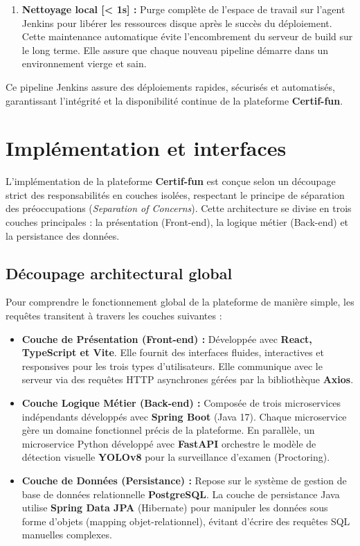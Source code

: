 \begin{enumerate}
    \item \textbf{Nettoyage local [< 1s] :} Purge complète de l'espace de travail sur l'agent Jenkins pour libérer les ressources disque après le succès du déploiement. Cette maintenance automatique évite l'encombrement du serveur de build sur le long terme. Elle assure que chaque nouveau pipeline démarre dans un environnement vierge et sain.
\end{enumerate}

Ce pipeline Jenkins assure des déploiements rapides, sécurisés et automatisés, garantissant l'intégrité et la disponibilité continue de la plateforme \textbf{Certif-fun}.


\section{Implémentation et interfaces}
L'implémentation de la plateforme \textbf{Certif-fun} est conçue selon un découpage strict des responsabilités en couches isolées, respectant le principe de séparation des préoccupations (\textit{Separation of Concerns}). Cette architecture se divise en trois couches principales : la présentation (Front-end), la logique métier (Back-end) et la persistance des données.

\subsection{Découpage architectural global}
Pour comprendre le fonctionnement global de la plateforme de manière simple, les requêtes transitent à travers les couches suivantes :
\begin{itemize}
    \item \textbf{Couche de Présentation (Front-end) :} Développée avec \textbf{React, TypeScript et Vite}. Elle fournit des interfaces fluides, interactives et responsives pour les trois types d'utilisateurs. Elle communique avec le serveur via des requêtes HTTP asynchrones gérées par la bibliothèque \textbf{Axios}.
    \item \textbf{Couche Logique Métier (Back-end) :} Composée de trois microservices indépendants développés avec \textbf{Spring Boot} (Java 17). Chaque microservice gère un domaine fonctionnel précis de la plateforme. En parallèle, un microservice Python développé avec \textbf{FastAPI} orchestre le modèle de détection visuelle \textbf{YOLOv8} pour la surveillance d'examen (Proctoring).
    \item \textbf{Couche de Données (Persistance) :} Repose sur le système de gestion de base de données relationnelle \textbf{PostgreSQL}. La couche de persistance Java utilise \textbf{Spring Data JPA} (Hibernate) pour manipuler les données sous forme d'objets (mapping objet-relationnel), évitant d'écrire des requêtes SQL manuelles complexes.
\end{itemize}

